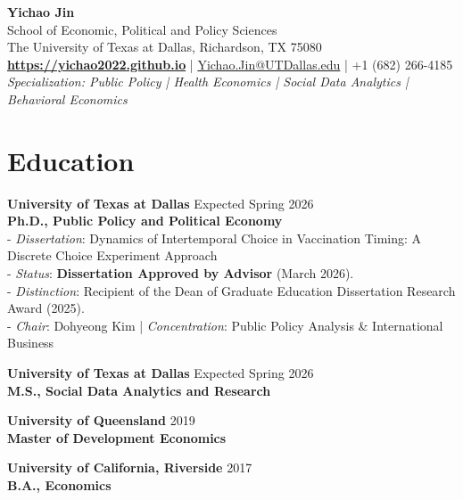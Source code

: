 \documentclass[11pt]{article}
\begin{document}
\begin{center}
    {\huge \textbf{Yichao Jin}} \\
    \vspace{0.5em}
    School of Economic, Political and Policy Sciences \\
    The University of Texas at Dallas, Richardson, TX 75080 \\
    \vspace{0.5em}
    \href{https://yichao2022.github.io}{\textbf{https://yichao2022.github.io}} \quad | \quad \href{mailto:Yichao.Jin@UTDallas.edu}{Yichao.Jin@UTDallas.edu} \quad | \quad +1 (682) 266-4185 \\
    \vspace{0.5em}
    \textit{Specialization: Public Policy | Health Economics | Social Data Analytics | Behavioral Economics}
\end{center}

\vspace{1em}
\noindent\hrulefill

\section*{Education}
\textbf{University of Texas at Dallas} \hfill Expected Spring 2026 \\
\textbf{Ph.D., Public Policy and Political Economy} \\
- \textit{Dissertation}: Dynamics of Intertemporal Choice in Vaccination Timing: A Discrete Choice Experiment Approach \\
- \textit{Status}: \textbf{Dissertation Approved by Advisor} (March 2026). \\
- \textit{Distinction}: Recipient of the Dean of Graduate Education Dissertation Research Award (2025). \\
- \textit{Chair}: Dohyeong Kim \quad | \quad \textit{Concentration}: Public Policy Analysis \& International Business

\vspace{0.5em}
\noindent \textbf{University of Texas at Dallas} \hfill Expected Spring 2026 \\
\textbf{M.S., Social Data Analytics and Research}

\vspace{0.5em}
\noindent \textbf{University of Queensland} \hfill 2019 \\
\textbf{Master of Development Economics}

\vspace{0.5em}
\noindent \textbf{University of California, Riverside} \hfill 2017 \\
\textbf{B.A., Economics}
\end{document}
